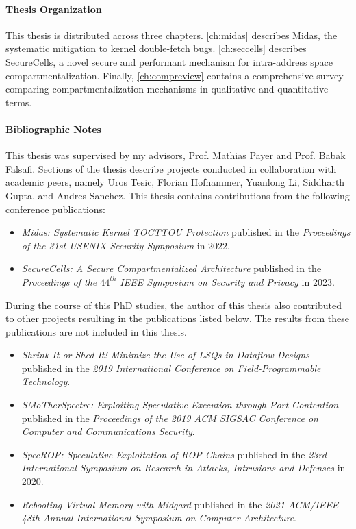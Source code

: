 \paragraph{Thesis Organization}
This thesis is distributed across three chapters. 
\autoref{ch:midas} describes Midas, the systematic mitigation to
kernel double-fetch bugs.
\autoref{ch:seccells} describes SecureCells, a novel secure and performant 
mechanism for intra-address space compartmentalization.
Finally, \autoref{ch:compreview} contains a comprehensive survey comparing
compartmentalization mechanisms in qualitative and quantitative terms.

\paragraph{Bibliographic Notes}
This thesis was supervised by my advisors, Prof. Mathias Payer and Prof. Babak Falsafi.
Sections of the thesis describe projects conducted in collaboration with academic peers, 
namely Uros Tesic, Florian Hofhammer, Yuanlong Li, Siddharth Gupta, and Andres Sanchez.
This thesis contains contributions from the following conference publications:
\begin{itemize}
      \item \emph{Midas: Systematic Kernel TOCTTOU Protection} published in
            the 
            \emph{Proceedings of the 31st USENIX Security Symposium} in 2022.
      \item \emph{SecureCells: A Secure Compartmentalized Architecture} published in
            the 
            \emph{Proceedings of the $44^{th}$ IEEE Symposium on Security and Privacy} 
            in 2023.
\end{itemize}

During the course of this PhD studies, the author of this thesis also contributed to
other projects resulting in the publications listed below.
The results from these publications are not included in this thesis.
\begin{itemize}
      \item \emph{Shrink It or Shed It! Minimize the Use of LSQs in Dataflow Designs}
            published in the
            \emph{2019 International Conference on Field-Programmable Technology}.
      \item \emph{SMoTherSpectre: Exploiting Speculative Execution through Port Contention}
            published in the
            \emph{Proceedings of the 2019 ACM SIGSAC Conference on Computer and Communications Security}.
      \item \emph{SpecROP: Speculative Exploitation of ROP Chains}
            published in the
            \emph{23rd International Symposium on Research in Attacks, Intrusions and Defenses}
            in 2020.
      \item \emph{Rebooting Virtual Memory with Midgard}
            published in the
            \emph{2021 ACM/IEEE 48th Annual International Symposium on Computer Architecture}.
\end{itemize}
